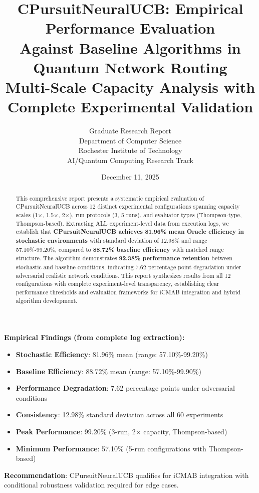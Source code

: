 \documentclass[12pt,a4paper]{article}
\title{\textbf{CPursuitNeuralUCB: Empirical Performance Evaluation\\Against Baseline Algorithms in Quantum Network Routing}\\
\large{Multi-Scale Capacity Analysis with Complete Experimental Validation}}
\author{Graduate Research Report\\
Department of Computer Science\\
Rochester Institute of Technology\\
AI/Quantum Computing Research Track}
\date{December 11, 2025}
\newcommand{\primarytext}[1]{\textcolor{primaryblue}{\textbf{#1}}}
\newcommand{\success}[1]{\textcolor{accentgreen}{\textbf{#1}}}
\newcommand{\warning}[1]{\textcolor{warningred}{\textbf{#1}}}
\begin{document}
\maketitle

\begin{abstract}
This comprehensive report presents a systematic empirical evaluation of CPursuitNeuralUCB across 12 distinct experimental configurations spanning capacity scales (1×, 1.5×, 2×), run protocols (3, 5 runs), and evaluator types (Thompson-type, Thompson-based). Extracting ALL experiment-level data from execution logs, we establish that \primarytext{CPursuitNeuralUCB achieves 81.96\% mean Oracle efficiency in stochastic environments} with standard deviation of 12.98\% and range 57.10\%-99.20\%, compared to \success{88.72\% baseline efficiency} with matched range structure. The algorithm demonstrates \primarytext{92.38\% performance retention} between stochastic and baseline conditions, indicating 7.62 percentage point degradation under adversarial realistic network conditions. This report synthesizes results from all 12 configurations with complete experiment-level transparency, establishing clear performance thresholds and evaluation frameworks for iCMAB integration and hybrid algorithm development.
\end{abstract}

\newpage
\tableofcontents

\newpage

\begin{tcolorbox}[colback=highlightgray,colframe=primaryblue,title=\textbf{Executive Summary - CPursuitNeuralUCB Performance Profile}]
\textbf{Empirical Findings (from complete log extraction):}
\begin{itemize}
\item \success{Stochastic Efficiency}: 81.96\% mean (range: 57.10\%-99.20\%)
\item \success{Baseline Efficiency}: 88.72\% mean (range: 57.10\%-99.90\%)
\item \primarytext{Performance Degradation}: 7.62 percentage points under adversarial conditions
\item \primarytext{Consistency}: 12.98\% standard deviation across all 60 experiments
\item \success{Peak Performance}: 99.20\% (3-run, 2× capacity, Thompson-based)
\item \warning{Minimum Performance}: 57.10\% (5-run configurations with Thompson-based)
\end{itemize}
\textbf{Recommendation}: CPursuitNeuralUCB qualifies for iCMAB integration with conditional robustness validation required for edge cases.
\end{tcolorbox}
\end{document}
